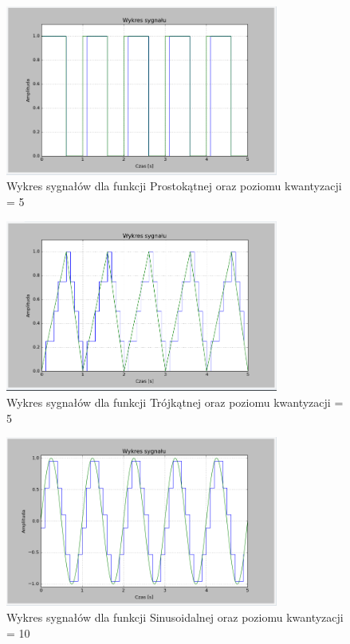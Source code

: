 \documentclass{article}
\begin{document}
    \begin{figure}[h!]
        \centering
        \includegraphics[width=0.8\textwidth]{img/1/quad_rect_2.png}
        \caption{Wykres sygnałów dla funkcji Prostokątnej oraz poziomu kwantyzacji = 5}
    \end{figure}
    \FloatBarrier

    \begin{figure}[h!]
        \centering
        \includegraphics[width=0.8\textwidth]{img/1/quad_tri_5.png}
        \caption{Wykres sygnałów dla funkcji Trójkątnej oraz poziomu kwantyzacji = 5}
    \end{figure}
    \FloatBarrier

    \begin{figure}[h!]
        \centering
        \includegraphics[width=0.8\textwidth]{img/1/quad_sin_10.png}
        \caption{Wykres sygnałów dla funkcji Sinusoidalnej oraz poziomu kwantyzacji = 10}
    \end{figure}
    \FloatBarrier
\end{document}
